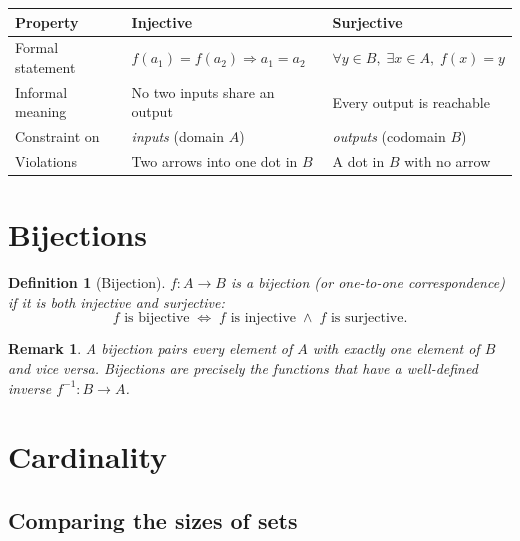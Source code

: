\documentclass[11pt]{article}
\theoremstyle{defstyle}
\newtheorem{definition}{Definition}[section]
\theoremstyle{thmstyle}
\theoremstyle{notstyle}
\newtheorem*{remark}{Remark}
\theoremstyle{cautionstyle}
\begin{document}
\begin{center}
\renewcommand{\arraystretch}{1.5}
\begin{tabular}{|l|l|l|}
\hline
\textbf{Property} & \textbf{Injective} & \textbf{Surjective} \\
\hline
Formal statement
  & $f(a_1)=f(a_2) \Rightarrow a_1=a_2$
  & $\forall y\in B,\;\exists x\in A,\; f(x)=y$ \\
Informal meaning
  & No two inputs share an output
  & Every output is reachable \\
Constraint on
  & \emph{inputs} (domain $A$)
  & \emph{outputs} (codomain $B$) \\
Violations
  & Two arrows into one dot in $B$
  & A dot in $B$ with no arrow \\
\hline
\end{tabular}
\end{center}

\section{Bijections}

\begin{defbox}
\begin{definition}[Bijection]
$f : A \to B$ is a \emph{bijection} (or \emph{one-to-one correspondence}) if it is both injective and surjective:
\[
  f \text{ is bijective} \;\iff\; f \text{ is injective} \;\wedge\; f \text{ is surjective}.
\]
\end{definition}
\end{defbox}

\begin{notebox}
\begin{remark}
A bijection pairs every element of $A$ with exactly one element of $B$ and vice versa.  Bijections are precisely the functions that have a well-defined inverse $f^{-1}: B \to A$.
\end{remark}
\end{notebox}

\section{Cardinality}

\subsection{Comparing the sizes of sets}
\end{document}
